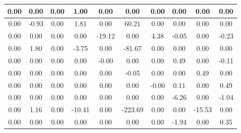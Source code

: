 \begin{tiny}\begin{tabular}{|c|c|c|c|c|c|c|c|c|c|}
\hline
0.00&0.00&0.00&1.00&0.00&0.00&0.00&0.00&0.00&0.00\\\hline
0.00&-0.93&0.00&1.81&0.00&60.21&0.00&0.00&0.00&0.00\\\hline
0.00&0.00&0.00&0.00&-19.12&0.00&4.38&-0.05&0.00&-0.23\\\hline
0.00&1.80&0.00&-3.75&0.00&-81.67&0.00&0.00&0.00&0.00\\\hline
0.00&0.00&0.00&0.00&-0.00&0.00&0.00&0.49&0.00&-0.11\\\hline
0.00&0.00&0.00&0.00&0.00&-0.05&0.00&0.00&0.49&0.00\\\hline
0.00&0.00&0.00&0.00&0.00&0.00&-0.00&0.11&0.00&0.49\\\hline
0.00&0.00&0.00&0.00&0.00&0.00&0.00&-6.26&0.00&-1.04\\\hline
0.00&1.16&0.00&-10.41&0.00&-223.69&0.00&0.00&-15.53&0.00\\\hline
0.00&0.00&0.00&0.00&0.00&0.00&0.00&-1.94&0.00&0.35\\\hline
\end{tabular}
\end{tiny}